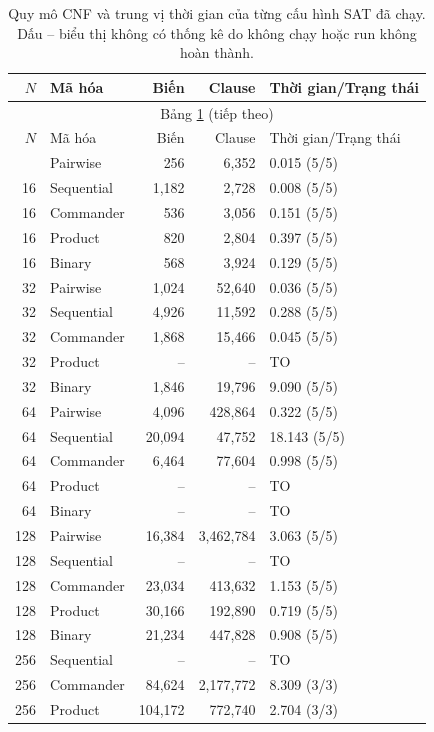 \begin{longtable}{rlrrl}
\caption{Quy mô CNF và trung vị thời gian của từng cấu hình SAT đã chạy. Dấu -- biểu thị không có thống kê do không chạy hoặc run không hoàn thành.}\label{tab:full-sat-scale}\\
\toprule
$N$ & Mã hóa & Biến & Clause & Thời gian/Trạng thái \\
\midrule
\endfirsthead
\multicolumn{5}{c}{Bảng \ref{tab:full-sat-scale} (tiếp theo)}\\
\toprule
$N$ & Mã hóa & Biến & Clause & Thời gian/Trạng thái \\
\midrule
\endhead
\bottomrule
\endfoot
16 & Pairwise & 256 & 6,352 & 0.015 (5/5) \\
16 & Sequential & 1,182 & 2,728 & 0.008 (5/5) \\
16 & Commander & 536 & 3,056 & 0.151 (5/5) \\
16 & Product & 820 & 2,804 & 0.397 (5/5) \\
16 & Binary & 568 & 3,924 & 0.129 (5/5) \\
32 & Pairwise & 1,024 & 52,640 & 0.036 (5/5) \\
32 & Sequential & 4,926 & 11,592 & 0.288 (5/5) \\
32 & Commander & 1,868 & 15,466 & 0.045 (5/5) \\
32 & Product & -- & -- & TO \\
32 & Binary & 1,846 & 19,796 & 9.090 (5/5) \\
64 & Pairwise & 4,096 & 428,864 & 0.322 (5/5) \\
64 & Sequential & 20,094 & 47,752 & 18.143 (5/5) \\
64 & Commander & 6,464 & 77,604 & 0.998 (5/5) \\
64 & Product & -- & -- & TO \\
64 & Binary & -- & -- & TO \\
128 & Pairwise & 16,384 & 3,462,784 & 3.063 (5/5) \\
128 & Sequential & -- & -- & TO \\
128 & Commander & 23,034 & 413,632 & 1.153 (5/5) \\
128 & Product & 30,166 & 192,890 & 0.719 (5/5) \\
128 & Binary & 21,234 & 447,828 & 0.908 (5/5) \\
256 & Sequential & -- & -- & TO \\
256 & Commander & 84,624 & 2,177,772 & 8.309 (3/3) \\
256 & Product & 104,172 & 772,740 & 2.704 (3/3) \\

\end{longtable}
